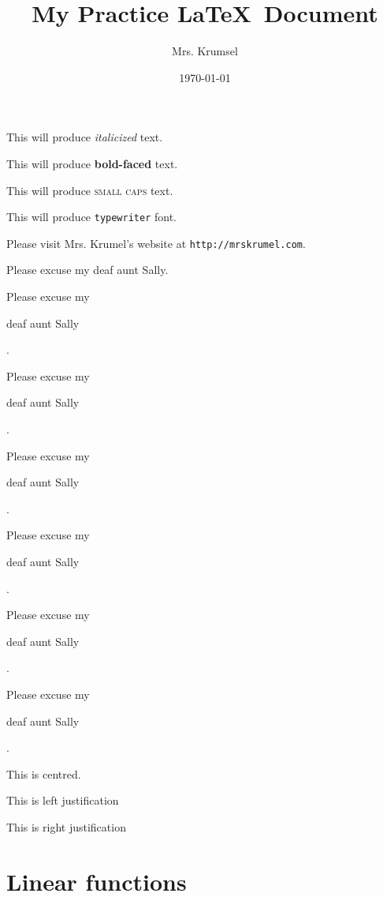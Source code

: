 \documentclass[11pt]{article}
\begin{document}
\tableofcontents

\title{My Practice \LaTeX \ Document}
\author{Mrs. Krumsel}
\date{\today}
\maketitle

This will produce \textit{italicized} text.

This will produce \textbf{bold-faced} text.

This will produce \textsc{small caps} text.

This will produce \texttt{typewriter} font.

Please visit Mrs. Krumel's website at
\texttt{http://mrskrumel.com}.

Please excuse my deaf aunt Sally.

Please excuse my 
\begin{large}
deaf aunt Sally
\end{large}.

Please excuse my 
\begin{Large}
deaf aunt Sally
\end{Large}.

Please excuse my 
\begin{huge}
deaf aunt Sally
\end{huge}.

Please excuse my 
\begin{Huge}
deaf aunt Sally
\end{Huge}.

Please excuse my 
\begin{small}
deaf aunt Sally
\end{small}.

Please excuse my 
\begin{tiny}
deaf aunt Sally
\end{tiny}.

\begin{center}
This is centred.
\end{center}

\begin{flushleft}
This is left justification
\end{flushleft}

\begin{flushright}
This is right justification
\end{flushright}

\section{Linear functions}
\end{document}

